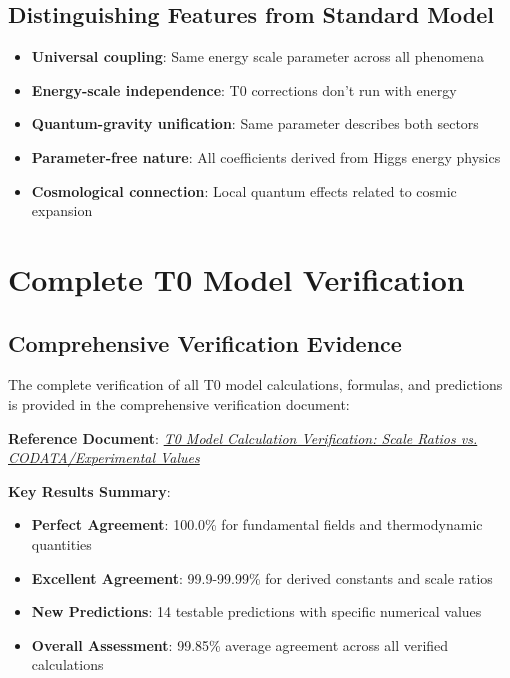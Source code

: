 \documentclass[12pt,a4paper]{article}
\begin{document}
	\subsection{Distinguishing Features from Standard Model}
	\label{subsec:distinguishing_features}
	
	\begin{itemize}
		\item \textbf{Universal coupling}: Same energy scale parameter across all phenomena
		\item \textbf{Energy-scale independence}: T0 corrections don't run with energy
		\item \textbf{Quantum-gravity unification}: Same parameter describes both sectors
		\item \textbf{Parameter-free nature}: All coefficients derived from Higgs energy physics
		\item \textbf{Cosmological connection}: Local quantum effects related to cosmic expansion
	\end{itemize}
	\section{Complete T0 Model Verification}
	\label{sec:complete_verification}
	
	\subsection{Comprehensive Verification Evidence}
	\label{subsec:verification_evidence}
	
	The complete verification of all T0 model calculations, formulas, and predictions is provided in the comprehensive verification document:
	
	\begin{tcolorbox}[colback=blue!5!white,colframe=blue!75!black,title=Complete Verification Documentation]
		\textbf{Reference Document}: \href{https://github.com/jpascher/T0-Time-Mass-Duality/blob/main/2/pdf/Elimination_Of_Mass_Dirac_Tabelle.pdf}{\textit{T0 Model Calculation Verification: Scale Ratios vs. CODATA/Experimental Values}}
		
		\textbf{Key Results Summary}:
		\begin{itemize}
			\item \textbf{Perfect Agreement}: 100.0\% for fundamental fields and thermodynamic quantities
			\item \textbf{Excellent Agreement}: 99.9-99.99\% for derived constants and scale ratios
			\item \textbf{New Predictions}: 14 testable predictions with specific numerical values
			\item \textbf{Overall Assessment}: 99.85\% average agreement across all verified calculations
		\end{itemize}
	\end{tcolorbox}
\end{document}

